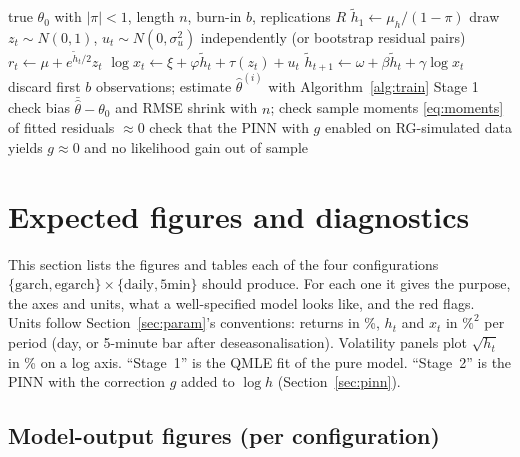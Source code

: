 \documentclass[11pt]{article}
\newcommand{\lh}{\tilde h}
\begin{document}
\begin{algorithm}[h]
\caption{Simulation and parameter-recovery test}\label{alg:sim}
\begin{algorithmic}[1]
\Require true $\theta_0$ with $|\pi|<1$, length $n$, burn-in $b$, replications $R$
  \State $\lh_1\gets\mu_h/(1-\pi)$ 
    \State draw $z_t\sim N(0,1)$, $u_t\sim N(0,\sigma_u^2)$ independently (or bootstrap residual pairs)
    \State $r_t\gets\mu+e^{\lh_t/2}z_t$
    \State $\log x_t\gets\xi+\varphi\lh_t+\tau(z_t)+u_t$
    \State $\lh_{t+1}\gets\omega+\beta\lh_t+\gamma\log x_t$
  \EndFor
  \State discard first $b$ observations; estimate $\hat\theta^{(i)}$ with Algorithm~\ref{alg:train} Stage 1
\EndFor
\State check bias $\bar{\hat\theta}-\theta_0$ and RMSE shrink with $n$; check sample moments \eqref{eq:moments} of fitted residuals $\approx0$
\State check that the PINN with $g$ enabled on RG-simulated data yields $g\approx0$ and no likelihood gain out of sample
\end{algorithmic}
\end{algorithm}

\section{Expected figures and diagnostics}\label{sec:figs}
This section lists the figures and tables each of the four configurations
$\{\text{garch},\text{egarch}\}\times\{\text{daily},\text{5min}\}$ should produce. For each one it
gives the purpose, the axes and units, what a well-specified model looks like, and the red flags.
Units follow Section~\ref{sec:param}'s conventions: returns in \%, $h_t$ and $x_t$ in $\%^2$ per
period (day, or 5-minute bar after deseasonalisation). Volatility panels plot $\sqrt{h_t}$ in \%
on a log axis. ``Stage~1'' is the QMLE fit of the pure model. ``Stage~2'' is the PINN with the
correction $g$ added to $\log h$ (Section~\ref{sec:pinn}).

\subsection{Model-output figures (per configuration)}\label{sec:figs-model}
\end{document}
